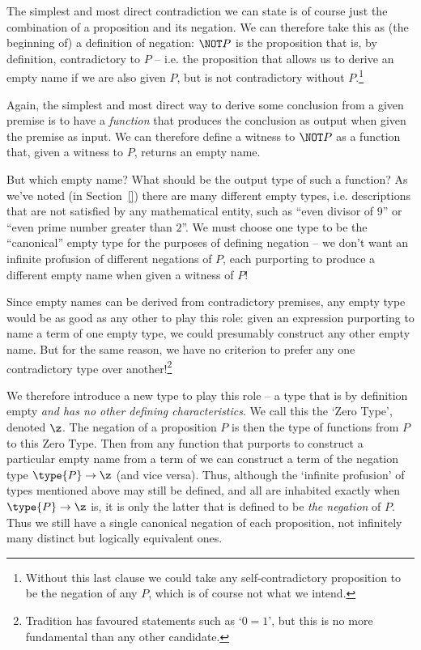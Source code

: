 The simplest and most direct contradiction we can state is of course just the combination of a proposition and its negation. We can therefore take this as (the beginning of) a definition of negation: $\NOT P$ is the proposition that is, by definition, contradictory to $P$ -- i.e. the proposition that allows us to derive an empty name if we are also given $P$, but is not contradictory without $P$.\footnote{
Without this last clause we could take any self-contradictory proposition to be the negation of any $P$, which is of course not what we intend.
}

Again, the simplest and most direct way to derive some conclusion from a given premise is to have a \emph{function} that produces the conclusion as output when given the premise as input. We can therefore define a witness to $\NOT P$ as a function that, given a witness to $P$, returns an empty name.

But which empty name?  What should be the output type of such a function?
As we've noted (in Section~\ref{}) there are many different empty types, i.e. descriptions that are not satisfied by any mathematical entity, such as ``even divisor of $9$'' or ``even prime number greater than $2$''.  We must choose one type to be the ``canonical'' empty type for the purposes of defining negation -- 
we don't want an infinite profusion of different negations of $P$, each purporting to produce a different empty name when given a witness of $P$!

Since empty names can be derived from contradictory premises, any empty type would be as good as any other to play this role: given an expression purporting to name a term of one empty type, we could presumably construct any other empty name.  But for the same reason, we have no criterion to prefer any one contradictory type over another!\footnote{
Tradition has favoured statements such as `$0=1$', but this is no more fundamental than any other candidate.
}

We therefore introduce a new type to play this role -- a type that is by definition empty \emph{and has no other defining characteristics}. We call this the `Zero Type', denoted $\z$. The negation of a proposition $P$ is then the type of functions from $P$ to this Zero Type. Then from any function that purports to construct a particular empty name from a term of  we can construct a term of the negation type $\type{P} \to \z$ (and vice versa). Thus, although the `infinite profusion' of types mentioned above may still be defined, and all are inhabited exactly when $\type{P} \to \z$ is, it is only the latter that is defined to be \emph{the negation} of $P$. Thus we still have a single canonical negation of each proposition, not infinitely many distinct but logically equivalent ones.

